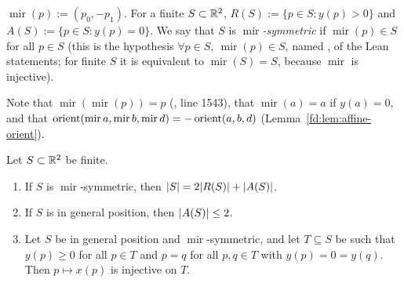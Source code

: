 \begin{definition}\label{mb:def:mir}
$\operatorname{mir}(p):=(p_0,-p_1)$. For a finite $S\subset\mathbb R^2$, $R(S):=\{p\in S:y(p)>0\}$ and
$A(S):=\{p\in S:y(p)=0\}$. We say that $S$ is \emph{$\operatorname{mir}$-symmetric} if $\operatorname{mir}(p)\in S$ for
all $p\in S$ (this is the hypothesis $\forall p\in S,\ \operatorname{mir}(p)\in S$, named , of the Lean
statements; for finite $S$ it is equivalent to $\operatorname{mir}(S)=S$, because $\operatorname{mir}$ is injective).
\end{definition}

Note that $\operatorname{mir}(\operatorname{mir}(p))=p$ (, line 1543), that
$\operatorname{mir}(a)=a$ if $y(a)=0$, and that $\operatorname{orient}(\operatorname{mir}a,\operatorname{mir}b,\operatorname{mir}d)
=-\operatorname{orient}(a,b,d)$ (Lemma~\ref{fd:lem:affine-orient}).

\begin{lemma}\label{mb:lem:split}
Let $S\subset\mathbb R^2$ be finite.
\begin{enumerate}[label=(\alph*)]
\item If $S$ is $\operatorname{mir}$-symmetric, then $\lvert S\rvert=2\lvert R(S)\rvert+\lvert A(S)\rvert$.
\item If $S$ is in general position, then $\lvert A(S)\rvert\le2$.
\item Let $S$ be in general position and $\operatorname{mir}$-symmetric, and let $T\subseteq S$ be such that $y(p)\ge0$
  for all $p\in T$ and $p=q$ for all $p,q\in T$ with $y(p)=0=y(q)$. Then $p\mapsto x(p)$ is injective on $T$.
\end{enumerate}
\end{lemma}

